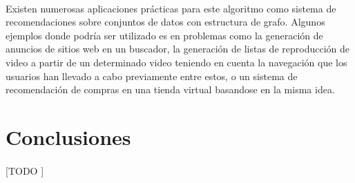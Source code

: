 \documentclass{subfiles}
\begin{document}
        \paragraph{}
        Existen numerosas aplicaciones prácticas para este algoritmo como sistema de recomendaciones sobre conjuntos de datos con estructura de grafo. Algunos ejemplos donde podría ser utilizado es en problemas como la generación de anuncios de sitios web en un buscador, la generación de listas de reproducción de video a partir de un determinado video teniendo en cuenta la navegación que los usuarios han llevado a cabo previamente entre estos, o un sistema de recomendación de compras en una tienda virtual basandose en la misma idea.

    \section{Conclusiones}
    \label{sec:pagerank_conclusions}

      \paragraph{}
      [TODO ]
\end{document}
